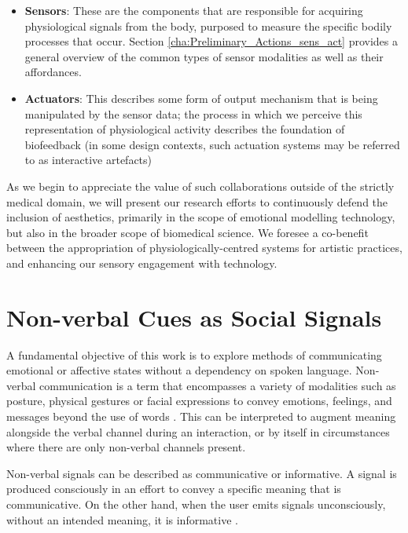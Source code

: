 \begin{itemize}
    \item \textbf{Sensors}: These are the components that are responsible for acquiring physiological signals from the body, purposed to measure the specific bodily processes that occur. Section \ref{cha:Preliminary_Actions_sens_act} provides a general overview of the common types of sensor modalities as well as their affordances.
    \item \textbf{Actuators}: This describes some form of output mechanism that is being manipulated by the sensor data; the process in which we perceive this representation of physiological activity describes the foundation of biofeedback (in some design contexts, such actuation systems may be referred to as interactive artefacts)
\end{itemize}

As we begin to appreciate the value of such collaborations outside of the strictly medical domain, we will present our research efforts to continuously defend the inclusion of aesthetics, primarily in the scope of emotional modelling technology, but also in the broader scope of biomedical science. We foresee a co-benefit between the appropriation of physiologically-centred systems for artistic practices, and enhancing our sensory engagement with technology.


\section{Non-verbal Cues as Social Signals}

A fundamental objective of this work is to explore methods of communicating emotional or affective states without a dependency on spoken language. Non-verbal communication is a term that encompasses a variety of modalities such as posture, physical gestures or facial expressions to convey emotions, feelings, and messages beyond the use of words \cite{knapp_nonverbal_2009, richmond_nonverbal_2011}. This can be interpreted to augment meaning alongside the verbal channel during an interaction, or by itself in circumstances where there are only non-verbal channels present.

Non-verbal signals can be described as communicative or informative. A signal is produced consciously in an effort to convey a specific meaning that is communicative. On the other hand, when the user emits signals unconsciously, without an intended meaning, it is informative \cite{vinciarelli_towards_2011}.

